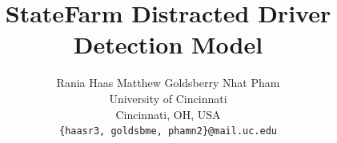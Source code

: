 \documentclass[10pt,twocolumn,letterpaper]{article}
\author{
Rania Haas \quad Matthew Goldsberry \quad Nhat Pham\\
University of Cincinnati\\
Cincinnati, OH, USA\\
{\tt\small \{haasr3, goldsbme, phamn2\}@mail.uc.edu}
}
\title{StateFarm Distracted Driver Detection Model}
\begin{document}
\maketitle










{
    \small
    \nocite{maDigitalTwin2024, xiongDrivingBehavior2026, tranDeepLDriving2018}
    
    
}

% 
\end{document}

